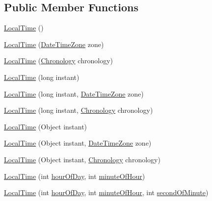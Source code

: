 \subsection*{Public Member Functions}
\begin{DoxyCompactItemize}
\item 
\hyperlink{classorg_1_1joda_1_1time_1_1_local_time_a6cffa63775706cb863fda386bb3a815e}{Local\-Time} ()
\item 
\hyperlink{classorg_1_1joda_1_1time_1_1_local_time_aa256b1c210f4287b0d9766a7f78ead47}{Local\-Time} (\hyperlink{classorg_1_1joda_1_1time_1_1_date_time_zone}{Date\-Time\-Zone} zone)
\item 
\hyperlink{classorg_1_1joda_1_1time_1_1_local_time_a837788bb8ec7bbbd27782455a7c43f10}{Local\-Time} (\hyperlink{classorg_1_1joda_1_1time_1_1_chronology}{Chronology} chronology)
\item 
\hyperlink{classorg_1_1joda_1_1time_1_1_local_time_a6f7183d9ce6184f547eca22095119e38}{Local\-Time} (long instant)
\item 
\hyperlink{classorg_1_1joda_1_1time_1_1_local_time_a721472d247e4cb7268f35eb53cba2b36}{Local\-Time} (long instant, \hyperlink{classorg_1_1joda_1_1time_1_1_date_time_zone}{Date\-Time\-Zone} zone)
\item 
\hyperlink{classorg_1_1joda_1_1time_1_1_local_time_a1166b12bf6d6dfb4743a2922c12811e1}{Local\-Time} (long instant, \hyperlink{classorg_1_1joda_1_1time_1_1_chronology}{Chronology} chronology)
\item 
\hyperlink{classorg_1_1joda_1_1time_1_1_local_time_a19bc315b380740ffd5059caa06e17f82}{Local\-Time} (Object instant)
\item 
\hyperlink{classorg_1_1joda_1_1time_1_1_local_time_ac6937b3022038fde54b43ccc500bae16}{Local\-Time} (Object instant, \hyperlink{classorg_1_1joda_1_1time_1_1_date_time_zone}{Date\-Time\-Zone} zone)
\item 
\hyperlink{classorg_1_1joda_1_1time_1_1_local_time_a37e08b569004e7aa65b6bd99d43a6174}{Local\-Time} (Object instant, \hyperlink{classorg_1_1joda_1_1time_1_1_chronology}{Chronology} chronology)
\item 
\hyperlink{classorg_1_1joda_1_1time_1_1_local_time_a9cdaed7a35de05062b93c1bae370b56d}{Local\-Time} (int \hyperlink{classorg_1_1joda_1_1time_1_1_local_time_a61533ce76db2296ae3217e1accb06397}{hour\-Of\-Day}, int \hyperlink{classorg_1_1joda_1_1time_1_1_local_time_a63d30bc94f90913864d8a0b1481d65a7}{minute\-Of\-Hour})
\item 
\hyperlink{classorg_1_1joda_1_1time_1_1_local_time_ac2c0fa3ebceb25bb06c16c92a95f58d2}{Local\-Time} (int \hyperlink{classorg_1_1joda_1_1time_1_1_local_time_a61533ce76db2296ae3217e1accb06397}{hour\-Of\-Day}, int \hyperlink{classorg_1_1joda_1_1time_1_1_local_time_a63d30bc94f90913864d8a0b1481d65a7}{minute\-Of\-Hour}, int \hyperlink{classorg_1_1joda_1_1time_1_1_local_time_a6b79349556e7a87b3ca25576aab58f42}{second\-Of\-Minute})

\end{DoxyCompactItemize}
